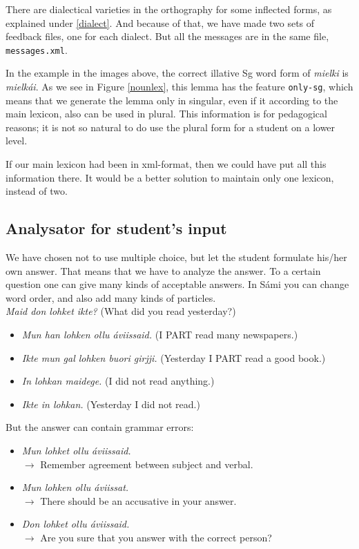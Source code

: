 \documentclass[a4paper,12pt]{article}
\begin{document}
There are dialectical varieties in the orthography for some inflected forms, as explained under \ref{dialect}. And because of that, we have made two sets of feedback files, one for each dialect. But all the messages are in the same file, \texttt{messages.xml}.

In the example in the images above, the correct illative Sg word form of \textit{mielki} is \textit{mielkái}. As we see in Figure \ref{nounlex}, this lemma has the feature \texttt{only-sg}, which means that we generate the lemma only in singular, even if it according to the main lexicon, also can be used in plural. This information is for pedagogical reasons; it is not so natural to do use the plural form for a student on a lower level.

If our main lexicon had been in xml-format, then we could have put all this information there. It would be a better solution to maintain only one lexicon, instead of two.


\subsection{Analysator for student's input}\label{sentencefeedback}
We have chosen not to use multiple choice, but let the student formulate his/her own answer. That means that we have to analyze the answer. To a certain question one can give many kinds of acceptable answers. In Sámi you can change word order, and also add many kinds of particles.\\

\textit{Maid don lohket ikte?} (What did you read yesterday?)
\begin{itemize}
\item \textit{Mun han lohken ollu áviissaid.} (I PART read many newspapers.)
\item \textit{Ikte mun gal lohken buori girjji.} (Yesterday I PART read a good book.)
\item \textit{In lohkan maidege.} (I did not read anything.)
\item \textit{Ikte in lohkan.} (Yesterday I did not read.)
\end{itemize}


But the answer can contain grammar errors:
\begin{itemize}
\item \textit{Mun lohket ollu áviissaid.} \\ $\rightarrow$ Remember agreement between subject and verbal.  
\item \textit{Mun lohken ollu áviissat.} \\ $\rightarrow$ There should be an accusative in your answer. 
\item \textit{Don lohket ollu áviissaid.} \\ $\rightarrow$ Are you sure that you answer with the correct person?  
\end{itemize}
\end{document}

